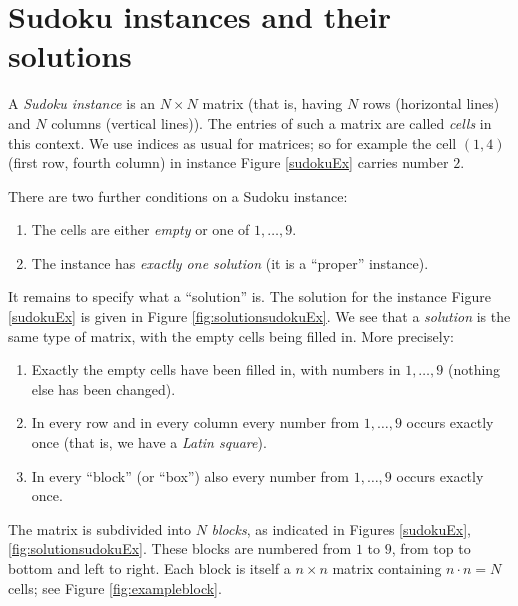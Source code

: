 \documentclass[11pt]{report}
\begin{document}
\section{Sudoku instances and their solutions}
\label{sec:Sudokuinstances}

A \textit{Sudoku instance} is an $N \times N$ matrix (that is, having $N$ rows (horizontal lines) and $N$ columns (vertical lines)). The entries of such a matrix are called \textit{cells} in this context. We use indices as usual for matrices; so for example the cell $(1,4)$ (first row, fourth column) in instance Figure \ref{sudokuEx} carries number $2$.

There are two further conditions on a Sudoku instance:
\begin{enumerate}
\item The cells are either \emph{empty} or one of $1, \dots, 9$.
\item The instance has \emph{exactly one solution} (it is a ``proper'' instance).
\end{enumerate}

It remains to specify what a ``solution'' is. The solution for the instance Figure \ref{sudokuEx} is given in Figure \ref{fig:solutionsudokuEx}. We see that a \textit{solution} is the same type of matrix, with the empty cells being filled in. More precisely:
\begin{enumerate}
\item Exactly the empty cells have been filled in, with numbers in $1,\dots,9$ (nothing else has been changed).
\item In every row and in every column every number from $1,\dots,9$ occurs exactly once (that is, we have a \emph{Latin square}).
\item In every ``block'' (or ``box'') also every number from $1,\dots,9$ occurs exactly once.
\end{enumerate}

The matrix is subdivided into $N$ \textit{blocks}, as indicated in Figures \ref{sudokuEx}, \ref{fig:solutionsudokuEx}. These blocks are numbered from $1$ to $9$, from top to bottom and left to right. Each block is itself a $n \times n$ matrix containing $n \cdot n = N$ cells; see Figure \ref{fig:exampleblock}.
\end{document}
